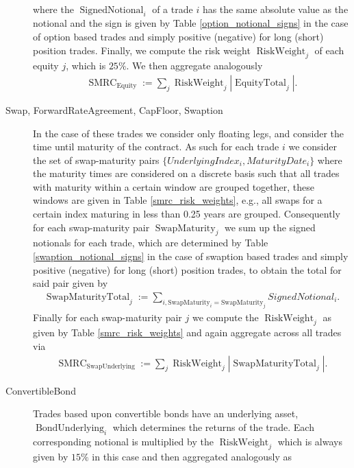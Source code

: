 \begin{description}
\begin{align*}
	\end{align*}
	where the $\operatorname{SignedNotional}_i$ of a trade $i$ has the same absolute value as the notional and the sign is given by Table \ref{option_notional_signs} in the case of option based trades and simply positive (negative) for long (short) position trades.
	Finally, we compute the risk weight $\operatorname{RiskWeight}_j$ of each equity $j$, which is $25\%$. We then aggregate analogously
	\begin{align*}
		\operatorname{SMRC}_{\text{Equity}} := \sum_{j}{\operatorname{RiskWeight}_j |\operatorname{EquityTotal}_{j}| }.
	\end{align*}
	\item[Swap, ForwardRateAgreement, CapFloor, Swaption] In the case of these trades we consider only floating legs, and consider the time until maturity of the contract. As such for each trade $i$ we consider the set of swap-maturity pairs $\{UnderlyingIndex_i, MaturityDate_i\}$ where the maturity times are considered on a discrete basis such that all trades with maturity within a certain window are grouped together, these windows are given in Table \ref{smrc_risk_weights}, e.g., all swaps for a certain index maturing in less than 0.25 years are grouped. Consequently for each swap-maturity pair $\operatorname{SwapMaturity}_j$ we sum up the signed notionals for each trade, which are determined by Table \ref{swaption_notional_signs} in the case of swaption based trades and simply positive (negative) for long (short) position trades, to obtain the total for said pair given by
	\begin{align*}
		\operatorname{SwapMaturityTotal}_{j} := \sum_{i, \text{SwapMaturity}_i = \text{SwapMaturity}_j} SignedNotional_i.
	\end{align*}
	Finally for each swap-maturity pair $j$ we compute the $\operatorname{RiskWeight}_j$ as given by Table \ref{smrc_risk_weights} and again aggregate across all trades via
	\begin{align*}
		\operatorname{SMRC}_{\text{SwapUnderlying}} := \sum_{j}{\operatorname{RiskWeight}_j |\operatorname{SwapMaturityTotal}_j|}.
	\end{align*}
	\item[ConvertibleBond] Trades based upon convertible bonds have an underlying asset, $\operatorname{BondUnderlying}_i$ which determines the returns of the trade. Each corresponding notional is multiplied by the $\operatorname{RiskWeight}_j$ which is always given by $15\%$ in this case and then aggregated analogously as
	\begin{align*}

\end{align*}
\end{description}
